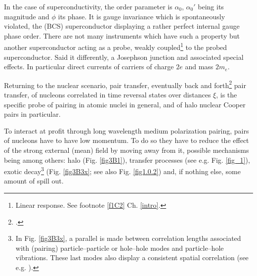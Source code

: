 In the case of superconductivity, the order parameter is $\alpha_0$, $\alpha_0'$ being its magnitude and $\phi$ its phase. It is gauge invariance which is spontaneously violated, the (BCS) superconductor displaying a rather perfect internal gauge phase order. There are not many instruments which have such a property but another superconductor acting as a probe, weakly coupled\footnote{Linear response. See footnote \ref{f1C2} Ch. \ref{intro}.} to the probed superconductor. Said it differently, a Josephson junction and associated special effects. In particular direct currents of carriers of charge $2e$ and mass $2m_e$.


Returning to the nuclear scenario, pair transfer, eventually back and forth\footnote{\cite{Potel:20b,r}.} pair transfer, of nucleons correlated in time reversal states over distances $\xi$, is the specific probe of pairing in atomic nuclei in general, and of halo nuclear Cooper pairs in particular.

 To interact at profit through long wavelength medium polarization pairing, pairs of nucleons have to have low momentum. To do so they have to reduce the effect of the strong external (mean) field by moving away from it, possible mechanisms being among others: halo (Fig. \ref{fig3B1}), transfer processes (see e.g. Fig. \ref{fig_1}), exotic decay\footnote{In Fig. \ref{fig3B3x}, a parallel is made between correlation lengths associated with (pairing) particle--particle or hole--hole modes and particle--hole vibrations. These last modes  also display a consistent spatial correlation (see e.g. \cite{Broglia:71}).} (Fig. \ref{fig3B3x}; see also Fig. \ref{fig1.0.2}) and, if nothing else, some amount of spill out.
